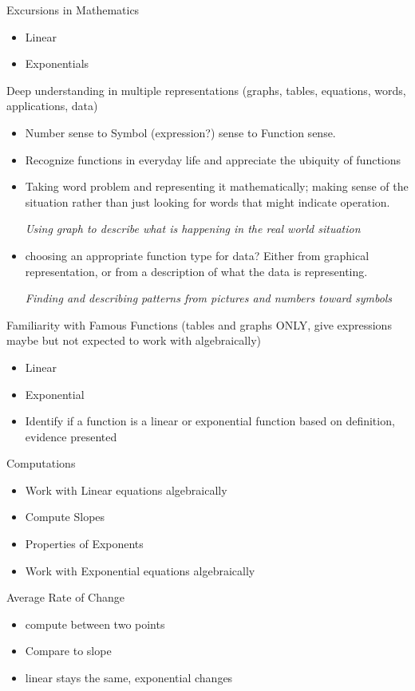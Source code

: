 \documentclass{ximera}
\begin{document}
\begin{objectives}
\item Excursions in Mathematics
	\begin{itemize}
	\item Linear  
	\item Exponentials 
	\end{itemize}
\item Deep understanding in multiple representations (graphs, tables, equations, words, applications, data)  
	\begin{itemize}
	\item Number sense to Symbol (expression?) sense to Function sense. 
	\item Recognize functions in everyday life and appreciate the ubiquity of functions 
	\item Taking word problem and representing it mathematically; making sense of the situation rather than just looking for words that might indicate operation. 

		\textit{Using graph to describe what is happening in the real world situation} 
	\item choosing an appropriate function type for data?  Either from graphical representation, or from a description of what the data is representing. 

		\textit{Finding and describing patterns from pictures and numbers toward symbols } 
	\end{itemize}
\item Familiarity with Famous Functions (tables and graphs ONLY, give expressions maybe but not expected to work with algebraically) 
	\begin{itemize}
	\item Linear 
	\item Exponential 
	\item Identify if a function is a linear or exponential function based on definition, evidence presented 
	\end{itemize}
\item Computations
	\begin{itemize}
	\item Work with Linear equations algebraically
	\item Compute Slopes
	\item Properties of Exponents 
	\item Work with Exponential equations algebraically 
	\end{itemize}
\item Average Rate of Change
	\begin{itemize}
	\item compute between two points
	\item Compare to slope 
	\item linear stays the same, exponential changes 
	\end{itemize}


\end{objectives}
\end{document}
